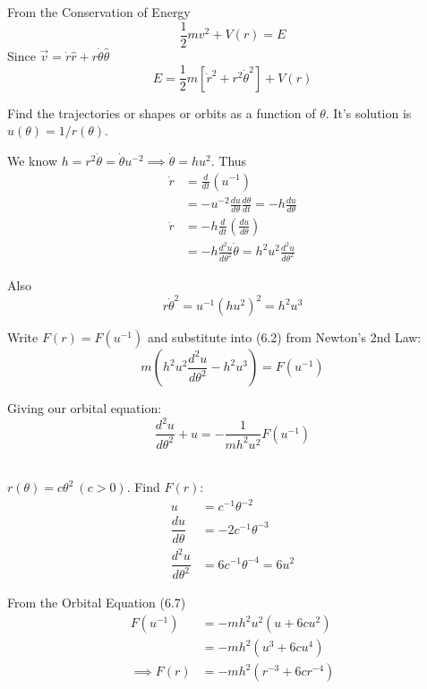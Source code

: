 \documentclass[10pt]{scrartcl}
\begin{document}
From the Conservation of Energy
\[\frac{1}{2}mv^2 + V(r) = E\]
Since $\vec{v} = \dot{r}\hat{r} + r\dot{\theta}\hat{\theta}$
\begin{equation}\boxed{E = \frac{1}{2}m[\dot{r}^2 + r^2\dot{\theta}^2] + V(r)}\end{equation}


Find the trajectories or shapes or orbits as a function of $\theta$. It's solution is $u(\theta) = 1/r(\theta)$. 


We know $h = r^2\dot{\theta} = \dot{\theta}u^{-2} \implies \dot{\theta} = hu^2$. Thus
\[\begin{aligned}
\dot{r} &= \frac{d}{dt}(u^{-1})\\
&= -u^{-2}\frac{du}{d\theta}\frac{d\theta}{dt} = -h\frac{du}{d\theta}\\[0.8cm]
\ddot{r} &= -h\frac{d}{dt}\left(\frac{du}{d\theta}\right)\\
&= -h\frac{d^2u}{d\theta^2}\dot{\theta} = h^2u^2\frac{d^2u}{d\theta^2}
\end{aligned}
\]

Also 
\[r\dot{\theta}^2 = u^{-1}(hu^2)^2 = h^2u^3\]


Write $F(r) = F(u^{-1})$ and substitute into (6.2) from Newton's 2nd Law:
\[m\left(h^2u^2\frac{d^2u}{d\theta^2} - h^2u^3\right) = F(u^{-1})\]

Giving our orbital equation:
\begin{equation} \boxed{\frac{d^2u}{d\theta^2} + u = -\frac{1}{mh^2u^2}F(u^{-1})} \end{equation}~

\begin{example}
	$r(\theta) = c\theta^2 ~(c > 0)$. Find $F(r)$:
\[\begin{aligned}
u &= c^{-1}\theta^{-2}\\
\dfrac{du}{d\theta} &= -2c^{-1}\theta^{-3}\\
\dfrac{d^2u}{d\theta^2} &= 6c^{-1}\theta^{-4} = 6u^2
\end{aligned}
\]
	
	From the Orbital Equation (6.7)
	\[\begin{aligned} F(u^{-1}) &= -mh^2u^2(u + 6cu^2)\\ &= -mh^2(u^3 + 6cu^4)\\
	\implies F(r) &= -mh^2(r^{-3} + 6cr^{-4})\end{aligned}\] 
\end{example}
 
\end{document}
